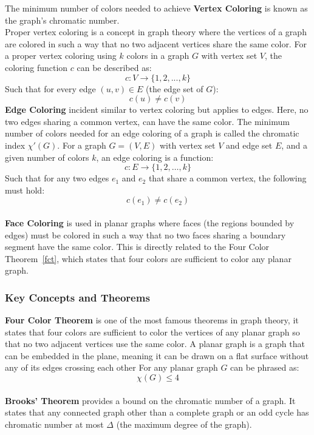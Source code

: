 \documentclass[12pt]{article}
\begin{document}
    The minimum number of colors needed to achieve \textbf{Vertex Coloring} is
    known as the graph's chromatic number.\\ Proper vertex coloring is a concept
    in graph theory where the vertices of a graph are colored in such a way that
    no two adjacent vertices share the same color. For a proper vertex coloring
    using \( k \) colors in a graph \( G \) with vertex set \( V \), the coloring
    function \( c \) can be described as:
    \begin{equation}
        c: V \rightarrow \{1, 2, ..., k\}
    \end{equation}
    Such that for every edge \( (u, v) \in E \) (the edge set of \( G \)):
    \begin{equation}
        c(u) \neq c(v)
    \end{equation}
    \textbf{Edge Coloring} incident similar to vertex coloring but applies to edges.
    Here, no two edges sharing a common vertex, can have the same color.
    The minimum number of colors needed for an edge coloring of a graph is called the
    chromatic index \( \chi'(G) \). For a graph \( G = (V, E) \) with vertex
    set \( V \) and edge set \( E \), and a given number of colors \( k \), an edge
    coloring is a function:
    \begin{equation}
        c: E \rightarrow \{1, 2, \dots, k\}
    \end{equation}
    Such that for any two edges \( e_1 \) and \( e_2 \) that share a common vertex,
    the following must hold:
    \begin{equation}
        c(e_1) \neq c(e_2)
    \end{equation}
    \\
    \textbf{Face Coloring} is used in planar graphs where faces (the regions
    bounded by edges) must be colored in such a way that no two faces sharing a
    boundary segment have the same color. This is directly related to the
    Four Color Theorem~\ref{fct}, which states that four colors are sufficient to color
    any planar graph.

    \subsubsection{Key Concepts and Theorems}

    \textbf{Four Color Theorem}\label{fct} is one of the most famous theorems in
    graph theory, it states that four colors are sufficient to color the vertices
    of any planar graph so that no two adjacent vertices use the same color.
    A planar graph is a graph that can be embedded in the plane, meaning it can
    be drawn on a flat surface without any of its edges crossing each other
    For any planar graph \( G \) can be phrased as:
    \begin{equation}
        \chi(G) \leq 4
    \end{equation}
    \\
    \textbf{Brooks' Theorem} provides a bound on the chromatic number of a graph.
    It states that any connected graph other than a complete graph or an odd cycle
    has chromatic number at most $\Delta$ (the maximum degree of the graph).
    
\end{document}
